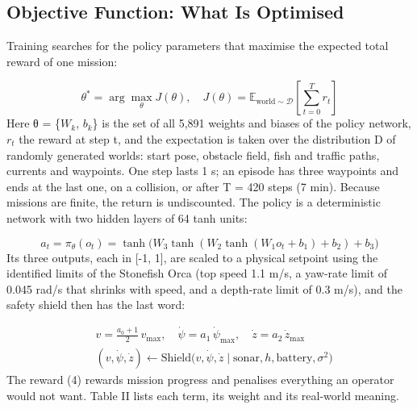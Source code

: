 \documentclass[conference]{IEEEtran}
\begin{document}
\subsection{Objective Function: What Is Optimised}
Training searches for the policy parameters that maximise the expected total reward of one mission:

\begin{equation}\theta^{*}=\arg\max_{\theta} J(\theta),\quad J(\theta)=\mathbb{E}_{\mathrm{world}\sim\mathcal{D}}\left[\sum_{t=0}^{T} r_t\right]\end{equation}
Here θ = \{$W_{k}$, $b_{k}$\} is the set of all 5,891 weights and biases of the policy network, $r_{t}$ the reward at step t, and the expectation is taken over the distribution D of randomly generated worlds: start pose, obstacle field, fish and traffic paths, currents and waypoints. One step lasts 1 s; an episode has three waypoints and ends at the last one, on a collision, or after T = 420 steps (7 min). Because missions are finite, the return is undiscounted. The policy is a deterministic network with two hidden layers of 64 tanh units:

\begin{equation}a_t=\pi_{\theta}(o_t)=\tanh\big(W_3\tanh(W_2\tanh(W_1 o_t+b_1)+b_2)+b_3\big)\end{equation}
Its three outputs, each in [-1, 1], are scaled to a physical setpoint using the identified limits of the Stonefish Orca (top speed 1.1 m/s, a yaw-rate limit of 0.045 rad/s that shrinks with speed, and a depth-rate limit of 0.3 m/s), and the safety shield then has the last word:

\begin{equation}\begin{split}&v=\tfrac{a_0+1}{2}\,v_{\max},\quad \dot\psi=a_1\,\dot\psi_{\max},\quad \dot z=a_2\,\dot z_{\max}\\&(v,\dot\psi,\dot z)\leftarrow\mathrm{Shield}\big(v,\dot\psi,\dot z\mid\mathrm{sonar},h,\mathrm{battery},\sigma^{2}\big)\end{split}\end{equation}
The reward (4) rewards mission progress and penalises everything an operator would not want. Table II lists each term, its weight and its real-world meaning.
\end{document}
